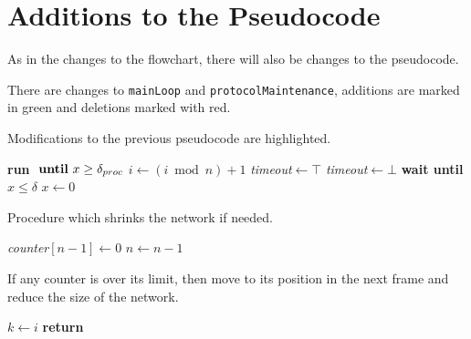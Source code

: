 \section{Additions to the Pseudocode}
As in the changes to the flowchart, there will also be changes to the pseudocode. 

There are changes to \texttt{mainLoop} and \texttt{protocolMaintenance}, additions are marked in green and deletions marked with red.

\begin{algorithm}[H]
\caption{Modifications to the previous pseudocode are highlighted.}
\label{lst:general_case2}
\begin{algorithmic}[1]
    \Repeat
        \State \textbf{run}  $\text{ \textbf{until} }x \ge \delta_{proc}$ 
        \State $i \gets (i \bmod n) + 1$  
                \CState {}
            \CEndIf
            \State {} 
            \State {}
                \CState {}
            \CEndIf
        \Else
            \CState \textit{timeout}$ \gets \top$
                    \State {}
                    \State {}
                    \CState \textit{timeout}$ \gets \bot$
                \EndIf
            \EndWhile
            \CState {}
        \EndIf
        \State \textbf{wait until } $x \le \delta$
        \State $x \gets 0$ 
\EndProcedure
\end{algorithmic}    
\end{algorithm}

\begin{algorithm}[H]
\caption{Procedure which shrinks the network if needed.}
\label{lst:general_case5}
\begin{algorithmic}[1]
        \State \textit{counter}$[n-1] \gets 0$
        \State $n \gets n - 1$
    \EndIf
\EndProcedure
\end{algorithmic}    
\end{algorithm} 

\begin{algorithm}[H]
\caption{If any counter is over its limit, then move to its position in the next frame and reduce the size of the network.}
\label{lst:general_case4}
\begin{algorithmic}[1]
            \State $k \gets i$
            \State \textbf{return}
        \EndIf
    \EndFor 
\EndProcedure
\end{algorithmic}    
\end{algorithm} 

